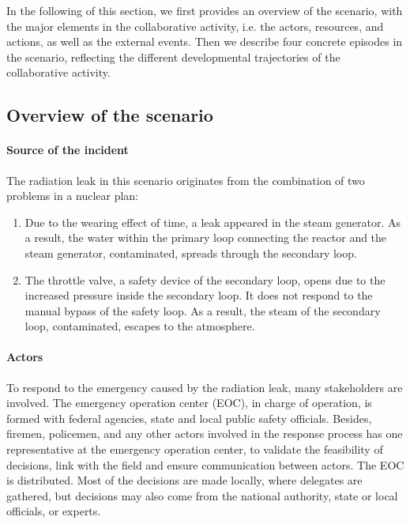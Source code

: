 In the following of this section, we first provides an overview of the scenario, with the major elements in the collaborative activity, i.e. the actors, resources, and actions, as well as the external events. Then we describe four concrete episodes in the scenario, reflecting the different developmental trajectories of the collaborative activity.

\subsection{Overview of the scenario} %
\label{sub:overview_of_the_scenario}

\paragraph*{Source of the incident} %
\label{par:source_of_the_incident}
The radiation leak in this scenario originates from the combination of two problems in a nuclear plan:
\begin{enumerate}
	\item Due to the wearing effect of time, a leak appeared in the steam generator. As a result, the water within the primary loop connecting the reactor and the steam generator, contaminated, spreads through the secondary loop.
	\item The throttle valve, a safety device of the secondary loop, opens due to the increased pressure inside the secondary loop. It does not respond to the manual bypass of the safety loop. As a result, the steam of the secondary loop, contaminated, escapes to the atmosphere.
\end{enumerate}

\paragraph*{Actors} %
\label{par:actors}
To respond to the emergency caused by the radiation leak, many stakeholders are involved. The emergency operation center (EOC), in charge of operation, is formed with federal agencies, state and local public safety officials. Besides, firemen, policemen, and any other actors involved in the response process has one representative at the emergency operation center, to validate the feasibility of decisions, link with the field and ensure communication between actors. The EOC is distributed. Most of the decisions are made locally, where delegates are gathered, but decisions may also come from the national authority, state or local officials, or experts.

